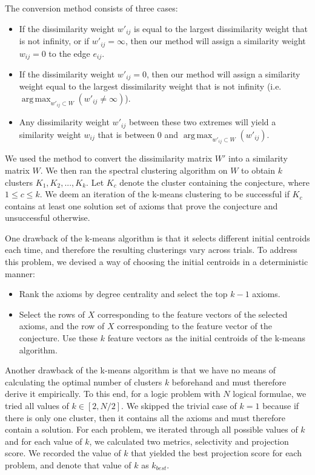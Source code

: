 \documentclass[EPiC]{easychair}
\DeclareMathOperator*{\argmaxA}{arg\,max} %
\begin{document}
The conversion method consists of three cases:
\begin{itemize}
\item If the dissimilarity weight $w'_{ij}$ is equal to the largest 
dissimilarity weight that is not infinity, or if $w'_{ij} = \infty$, then 
our method will assign a similarity weight $w_{ij} = 0$ to the edge $e_{ij}$.

\item If the dissimilarity weight $w'_{ij} = 0$, then our method will assign 
a similarity weight equal to the largest dissimilarity weight that is not 
infinity (i.e. $\argmaxA_{w'_{ij} \subset W} (w'_{ij} \neq \infty)$).

\item Any dissimilarity weight $w'_{ij}$ between these two extremes will 
yield a similarity weight $w_{ij}$ that is between 
$0$ and $\argmaxA_{w'_{ij} \subset W} (w'_{ij})$.
\end{itemize}

We used the method to convert the dissimilarity matrix $W'$ into a similarity
matrix $W$. We then ran the spectral clustering algorithm on $W$ 
to obtain $k$ clusters $K_{1}, K_{2}, ..., K_{k}$. Let $K_{c}$ denote the 
cluster containing the conjecture, where $1 \leq c \leq k$. We deem an
iteration of the k-means clustering to be successful if $K_{c}$ contains at 
least one solution set of axioms that prove the conjecture and unsuccessful 
otherwise.

One drawback of the k-means algorithm is that it selects different initial 
centroids each time, and therefore the resulting clusterings vary across 
trials. To address this problem, we devised a way of choosing the initial 
centroids in a deterministic manner:
\begin{itemize}
\item Rank the axioms by degree centrality and select the top $k-1$ axioms.
\item Select the rows of $X$ corresponding to the feature vectors of the
selected axioms, and the row of $X$ corresponding to the feature vector of 
the conjecture. Use these $k$ feature vectors as the initial centroids of 
the k-means algorithm. 
\end{itemize}

Another drawback of the k-means algorithm is that we have no means of 
calculating the optimal number of clusters $k$ beforehand and must therefore 
derive it empirically. To this end, for a logic problem with $N$ logical 
formulae, we tried all values of $k \in [2, N/2]$. We skipped the trivial 
case of $k=1$ because if there is only one cluster, then it contains all the 
axioms and must therefore contain a solution. For each problem, we iterated
through all possible values of $k$ and for each value of $k$, we calculated 
two metrics, selectivity and projection score. We recorded the value of $k$
that yielded the best projection score for each problem, and denote that 
value of $k$ as $k_{best}$. 
\end{document}
